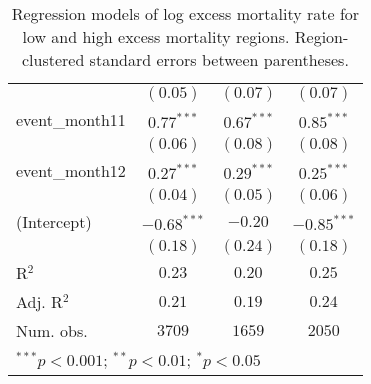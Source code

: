\begin{table}
\begin{center}
\begin{tabular}{l c c c}
               & $(0.05)$      & $(0.07)$      & $(0.07)$      \\
event\_month11 & $0.77^{***}$  & $0.67^{***}$  & $0.85^{***}$  \\
               & $(0.06)$      & $(0.08)$      & $(0.08)$      \\
event\_month12 & $0.27^{***}$  & $0.29^{***}$  & $0.25^{***}$  \\
               & $(0.04)$      & $(0.05)$      & $(0.06)$      \\
(Intercept)    & $-0.68^{***}$ & $-0.20$       & $-0.85^{***}$ \\
               & $(0.18)$      & $(0.24)$      & $(0.18)$      \\
\hline
R$^2$          & $0.23$        & $0.20$        & $0.25$        \\
Adj. R$^2$     & $0.21$        & $0.19$        & $0.24$        \\
Num. obs.      & $3709$        & $1659$        & $2050$        \\
\hline
\multicolumn{4}{l}{\scriptsize{$^{***}p<0.001$; $^{**}p<0.01$; $^{*}p<0.05$}}
\end{tabular}
\caption{Regression models of log excess mortality rate for low and high excess mortality regions. Region-clustered standard errors between parentheses.}
\label{tab:hilomodels}
\end{center}
\end{table}

